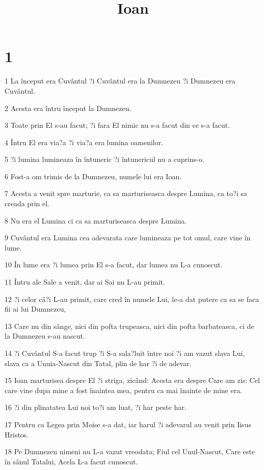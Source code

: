 

\title{Ioan}


\chapter{1}

\par 1 La început era Cuvântul ?i Cuvântul era la Dumnezeu ?i Dumnezeu era Cuvântul.
\par 2 Acesta era întru început la Dumnezeu.
\par 3 Toate prin El s-au facut; ?i fara El nimic nu s-a facut din ce s-a facut.
\par 4 Întru El era via?a ?i via?a era lumina oamenilor.
\par 5 ?i lumina lumineaza în întuneric ?i întunericul nu a cuprins-o.
\par 6 Fost-a om trimis de la Dumnezeu, numele lui era Ioan.
\par 7 Acesta a venit spre marturie, ca sa marturiseasca despre Lumina, ca to?i sa creada prin el.
\par 8 Nu era el Lumina ci ca sa marturiseasca despre Lumina.
\par 9 Cuvântul era Lumina cea adevarata care lumineaza pe tot omul, care vine în lume.
\par 10 În lume era ?i lumea prin El s-a facut, dar lumea nu L-a cunoscut.
\par 11 Întru ale Sale a venit, dar ai Sai nu L-au primit.
\par 12 ?i celor câ?i L-au primit, care cred în numele Lui, le-a dat putere ca sa se faca fii ai lui Dumnezeu,
\par 13 Care nu din sânge, nici din pofta trupeasca, nici din pofta barbateasca, ci de la Dumnezeu s-au nascut.
\par 14 ?i Cuvântul S-a facut trup ?i S-a sala?luit între noi ?i am vazut slava Lui, slava ca a Unuia-Nascut din Tatal, plin de har ?i de adevar.
\par 15 Ioan marturisea despre El ?i striga, zicând: Acesta era despre Care am zis: Cel care vine dupa mine a fost înaintea mea, pentru ca mai înainte de mine era.
\par 16 ?i din plinatatea Lui noi to?i am luat, ?i har peste har.
\par 17 Pentru ca Legea prin Moise s-a dat, iar harul ?i adevarul au venit prin Iisus Hristos.
\par 18 Pe Dumnezeu nimeni nu L-a vazut vreodata; Fiul cel Unul-Nascut, Care este în sânul Tatalui, Acela L-a facut cunoscut.
